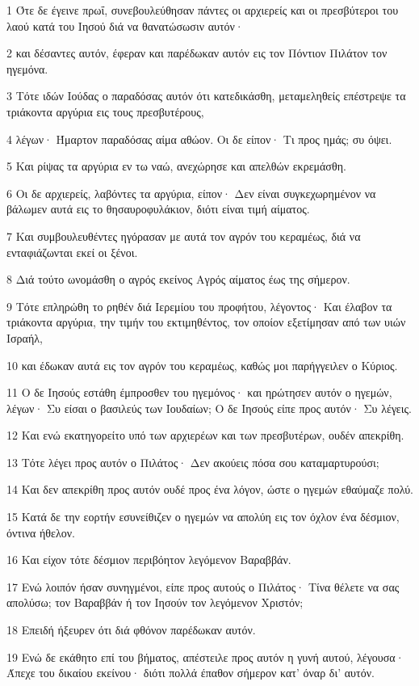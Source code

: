 \par 1 Ότε δε έγεινε πρωΐ, συνεβουλεύθησαν πάντες οι αρχιερείς και οι πρεσβύτεροι του λαού κατά του Ιησού διά να θανατώσωσιν αυτόν·
\par 2 και δέσαντες αυτόν, έφεραν και παρέδωκαν αυτόν εις τον Πόντιον Πιλάτον τον ηγεμόνα.
\par 3 Τότε ιδών Ιούδας ο παραδόσας αυτόν ότι κατεδικάσθη, μεταμεληθείς επέστρεψε τα τριάκοντα αργύρια εις τους πρεσβυτέρους,
\par 4 λέγων· Ήμαρτον παραδόσας αίμα αθώον. Οι δε είπον· Τι προς ημάς; συ όψει.
\par 5 Και ρίψας τα αργύρια εν τω ναώ, ανεχώρησε και απελθών εκρεμάσθη.
\par 6 Οι δε αρχιερείς, λαβόντες τα αργύρια, είπον· Δεν είναι συγκεχωρημένον να βάλωμεν αυτά εις το θησαυροφυλάκιον, διότι είναι τιμή αίματος.
\par 7 Και συμβουλευθέντες ηγόρασαν με αυτά τον αγρόν του κεραμέως, διά να ενταφιάζωνται εκεί οι ξένοι.
\par 8 Διά τούτο ωνομάσθη ο αγρός εκείνος Αγρός αίματος έως της σήμερον.
\par 9 Τότε επληρώθη το ρηθέν διά Ιερεμίου του προφήτου, λέγοντος· Και έλαβον τα τριάκοντα αργύρια, την τιμήν του εκτιμηθέντος, τον οποίον εξετίμησαν από των υιών Ισραήλ,
\par 10 και έδωκαν αυτά εις τον αγρόν του κεραμέως, καθώς μοι παρήγγειλεν ο Κύριος.
\par 11 Ο δε Ιησούς εστάθη έμπροσθεν του ηγεμόνος· και ηρώτησεν αυτόν ο ηγεμών, λέγων· Συ είσαι ο βασιλεύς των Ιουδαίων; Ο δε Ιησούς είπε προς αυτόν· Συ λέγεις.
\par 12 Και ενώ εκατηγορείτο υπό των αρχιερέων και των πρεσβυτέρων, ουδέν απεκρίθη.
\par 13 Τότε λέγει προς αυτόν ο Πιλάτος· Δεν ακούεις πόσα σου καταμαρτυρούσι;
\par 14 Και δεν απεκρίθη προς αυτόν ουδέ προς ένα λόγον, ώστε ο ηγεμών εθαύμαζε πολύ.
\par 15 Κατά δε την εορτήν εσυνείθιζεν ο ηγεμών να απολύη εις τον όχλον ένα δέσμιον, όντινα ήθελον.
\par 16 Και είχον τότε δέσμιον περιβόητον λεγόμενον Βαραββάν.
\par 17 Ενώ λοιπόν ήσαν συνηγμένοι, είπε προς αυτούς ο Πιλάτος· Τίνα θέλετε να σας απολύσω; τον Βαραββάν ή τον Ιησούν τον λεγόμενον Χριστόν;
\par 18 Επειδή ήξευρεν ότι διά φθόνον παρέδωκαν αυτόν.
\par 19 Ενώ δε εκάθητο επί του βήματος, απέστειλε προς αυτόν η γυνή αυτού, λέγουσα· Άπεχε του δικαίου εκείνου· διότι πολλά έπαθον σήμερον κατ' όναρ δι' αυτόν.
